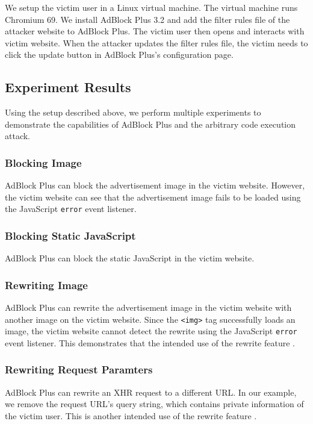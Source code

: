 \documentclass[conference]{IEEEtran}
\begin{document}
We setup the victim user in a Linux virtual machine. The virtual machine runs Chromium 69. We install AdBlock Plus 3.2 and add the filter rules file of the attacker website to AdBlock Plus. The victim user then opens and interacts with victim website. When the attacker updates the filter rules file, the victim needs to click the update button in AdBlock Plus's configuration page.

\subsection{Experiment Results}

Using the setup described above, we perform multiple experiments to demonstrate the capabilities of AdBlock Plus and the arbitrary code execution attack.

\subsubsection{Blocking Image}

AdBlock Plus can block the advertisement image in the victim website. However, the victim website can see that the advertisement image fails to be loaded using the JavaScript \lstinline{error} event listener.

\subsubsection{Blocking Static JavaScript}

AdBlock Plus can block the static JavaScript in the victim website.

\subsubsection{Rewriting Image}

AdBlock Plus can rewrite the advertisement image in the victim website with another image on the victim website. Since the \lstinline{<img>} tag successfully loads an image, the victim website cannot detect the rewrite using the JavaScript \lstinline{error} event listener. This demonstrates that the intended use of the rewrite feature \cite{abp_filter_guide}.

\subsubsection{Rewriting Request Paramters}

AdBlock Plus can rewrite an XHR request to a different URL. In our example, we remove the request URL's query string, which contains private information of the victim user. This is another intended use of the rewrite feature \cite{abp_issue_6622}.
\end{document}
